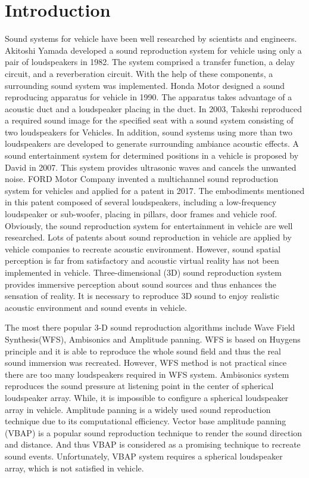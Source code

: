 \documentclass[runningheads,a4paper]{llncs}
\begin{document}
\section{Introduction}\label{sec:Intro}
Sound systems for vehicle have been well researched by scientists and engineers.   Akitoshi Yamada developed a sound reproduction system for vehicle using only a pair of loudspeakers in 1982\cite{Akito82}. The system comprised a transfer function, a delay circuit, and a reverberation circuit. With the help of these components, a surrounding sound system was implemented. 
Honda Motor designed a sound reproducing apparatus for vehicle in 1990\cite{terai1990sound}. The apparatus takes advantage of a acoustic duct and a loudspeaker placing in the duct. 
In 2003, Takeshi reproduced a required sound image for the specified seat with a sound system consisting of two loudspeakers for Vehicles\cite{Takeshi03}. 
In addition, sound systems using more than two loudspeakers are developed to generate surrounding ambiance acoustic effects\cite{clark1998vehicle}\cite{orellana2015loudspeaker}. A sound entertainment system for determined positions in a vehicle is proposed by David in 2007. This system provides ultrasonic waves and cancels the unwanted noise\cite{David07}. 
FORD Motor Company invented a multichannel sound reproduction system for vehicles and applied for a patent in 2017\cite{orellana2015loudspeaker}. The embodiments mentioned in this patent composed of several loudspeakers, including a low-frequency loudspeaker or sub-woofer, placing in pillars, door frames and vehicle roof. Obviously, the sound reproduction system for entertainment in vehicle are well researched. Lots of patents about sound reproduction in vehicle are applied by vehicle companies to recreate acoustic environment\cite{David07}\cite{Simon2005}\cite{Miriam2014}\cite{Gibson15}. However, sound spatial perception is far from satisfactory and acoustic virtual reality has not been implemented in vehicle. Three-dimensional (3D) sound reproduction system provides immersive perception about sound sources and thus enhances the sensation of reality\cite{AasthaTASLP11}\cite{Danilo15TMM}\cite{zms2015}. It is necessary to reproduce 3D sound to enjoy realistic acoustic environment and sound events in vehicle.

The most there popular 3-D sound reproduction algorithms include Wave Field Synthesis(WFS), Ambisonics and Amplitude panning. WFS is based on Huygens principle and it is able to reproduce the whole sound field and thus the real sound immersion was recreated\cite{Gergely17}. However, WFS method is not practical since there are too many loudspeakers required in WFS system. Ambisonics system reproduces the sound pressure at listening point in the center of spherical loudspeaker array. While, it is impossible to configure a spherical loudspeaker array in vehicle. Amplitude panning is a widely used sound reproduction technique due to its computational efficiency. Vector base amplitude panning (VBAP) is a popular sound reproduction technique to render the sound direction and distance. And thus VBAP is considered as a promising technique to recreate sound events\cite{Pulkki01spatial}. Unfortunately, VBAP system requires a spherical loudspeaker array, which is not satisfied in vehicle. 
\end{document}
